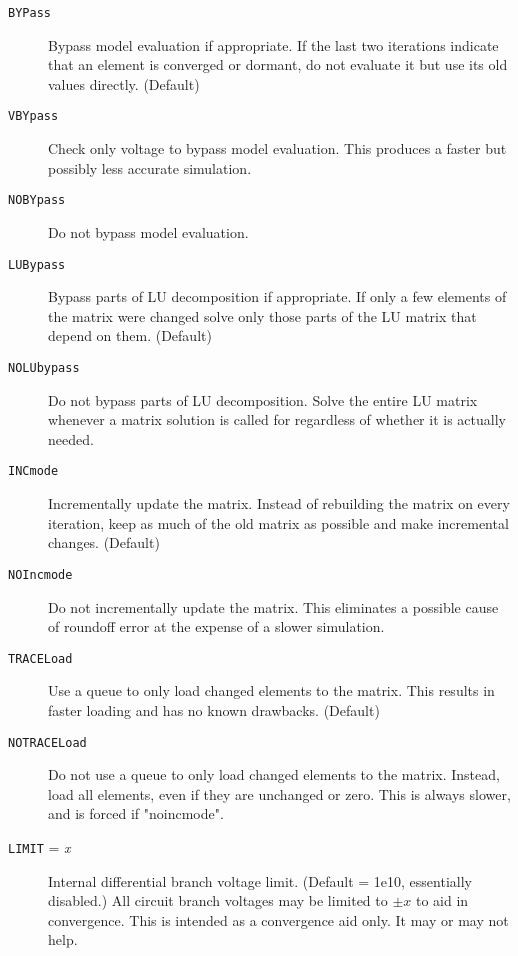 \begin{description}
\item[{\tt BYPass}] Bypass model evaluation if appropriate.  If the last two
iterations indicate that an element is converged or dormant, do not evaluate
it but use its old values directly.  (Default)

\item[{\tt VBYpass}] Check only voltage to bypass model evaluation.  This
produces a faster but possibly less accurate simulation.

\item[{\tt NOBYpass}] Do not bypass model evaluation.

\item[{\tt LUBypass}] Bypass parts of LU decomposition if appropriate.  If
only a few elements of the matrix were changed solve only those parts
of the LU matrix that depend on them.  (Default)

\item[{\tt NOLUbypass}] Do not bypass parts of LU decomposition.  Solve
the entire LU matrix whenever a matrix solution is called for regardless
of whether it is actually needed.  

\item[{\tt INCmode}] Incrementally update the matrix.  Instead of 
rebuilding the matrix on every iteration, keep as much of the old 
matrix as possible and make incremental changes.  (Default)

\item[{\tt NOIncmode}] Do not incrementally update the matrix.  This
eliminates a possible cause of roundoff error at the expense of a slower
simulation.

\item[{\tt TRACELoad}] Use a queue to only load changed elements
to the matrix.  This results in faster loading and has no known
drawbacks.  (Default)

\item[{\tt NOTRACELoad}] Do not use a queue to only load changed
elements to the matrix.  Instead, load all elements, even if they
are unchanged or zero.  This is always slower, and is forced if
"noincmode".

\item[{\tt LIMIT} = {\it x}] Internal differential branch voltage
limit.  (Default = 1e10, essentially disabled.)  All circuit branch
voltages may be limited to $\pm x$ to aid in convergence.  This is
intended as a convergence aid only.  It may or may not help.


\end{description}
